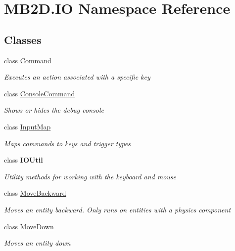\hypertarget{namespace_m_b2_d_1_1_i_o}{}\section{M\+B2\+D.\+IO Namespace Reference}
\label{namespace_m_b2_d_1_1_i_o}
\subsection*{Classes}
\begin{DoxyCompactItemize}
\item 
class \hyperlink{class_m_b2_d_1_1_i_o_1_1_command}{Command}
\begin{DoxyCompactList}\small\item\em Executes an action associated with a specific key \end{DoxyCompactList}\item 
class \hyperlink{class_m_b2_d_1_1_i_o_1_1_console_command}{Console\+Command}
\begin{DoxyCompactList}\small\item\em Shows or hides the debug console \end{DoxyCompactList}\item 
class \hyperlink{class_m_b2_d_1_1_i_o_1_1_input_map}{Input\+Map}
\begin{DoxyCompactList}\small\item\em Maps commands to keys and trigger types \end{DoxyCompactList}\item 
class {\bfseries I\+O\+Util}
\begin{DoxyCompactList}\small\item\em Utility methods for working with the keyboard and mouse \end{DoxyCompactList}\item 
class \hyperlink{class_m_b2_d_1_1_i_o_1_1_move_backward}{Move\+Backward}
\begin{DoxyCompactList}\small\item\em Moves an entity backward. Only runs on entities with a physics component \end{DoxyCompactList}\item 
class \hyperlink{class_m_b2_d_1_1_i_o_1_1_move_down}{Move\+Down}
\begin{DoxyCompactList}\small\item\em Moves an entity down \end{DoxyCompactList}\item 

\end{DoxyCompactItemize}
